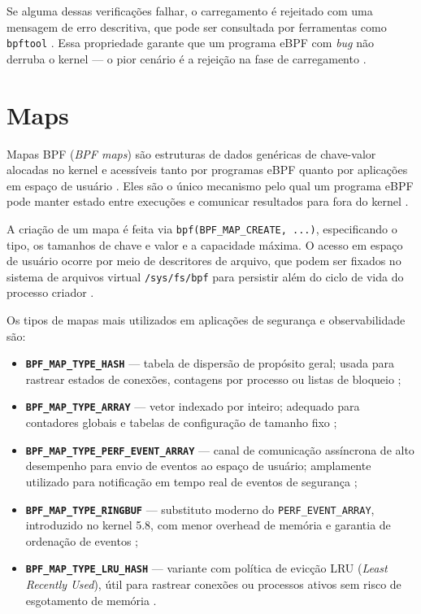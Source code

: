 Se alguma dessas verificações falhar, o carregamento é rejeitado com uma mensagem
de erro descritiva, que pode ser consultada por ferramentas como \texttt{bpftool}
\cite{bcc}.
Essa propriedade garante que um programa eBPF com \textit{bug} não derruba o
kernel — o pior cenário é a rejeição na fase de carregamento
\cite{gregg2019}.

\section{Maps}

Mapas BPF (\textit{BPF maps}) são estruturas de dados genéricas de chave-valor
alocadas no kernel e acessíveis tanto por programas eBPF quanto por aplicações
em espaço de usuário \cite{linuxkernel2024}.
Eles são o único mecanismo pelo qual um programa eBPF pode manter estado entre
execuções e comunicar resultados para fora do kernel \cite{gregg2019}.

A criação de um mapa é feita via \texttt{bpf(BPF\_MAP\_CREATE, ...)}, especificando
o tipo, os tamanhos de chave e valor e a capacidade máxima.
O acesso em espaço de usuário ocorre por meio de descritores de arquivo, que
podem ser fixados no sistema de arquivos virtual \texttt{/sys/fs/bpf} para
persistir além do ciclo de vida do processo criador \cite{linuxkernel2024}.

Os tipos de mapas mais utilizados em aplicações de segurança e observabilidade são:

\begin{itemize}
  \item \textbf{\texttt{BPF\_MAP\_TYPE\_HASH}} — tabela de dispersão de propósito
        geral; usada para rastrear estados de conexões, contagens por processo ou
        listas de bloqueio \cite{linuxkernel2024};

  \item \textbf{\texttt{BPF\_MAP\_TYPE\_ARRAY}} — vetor indexado por inteiro;
        adequado para contadores globais e tabelas de configuração de tamanho fixo
        \cite{gregg2019};

  \item \textbf{\texttt{BPF\_MAP\_TYPE\_PERF\_EVENT\_ARRAY}} — canal de
        comunicação assíncrona de alto desempenho para envio de eventos ao espaço
        de usuário; amplamente utilizado para notificação em tempo real de eventos
        de segurança \cite{linuxkernel2024};

  \item \textbf{\texttt{BPF\_MAP\_TYPE\_RINGBUF}} — substituto moderno do
        \texttt{PERF\_EVENT\_ARRAY}, introduzido no kernel 5.8, com menor
        overhead de memória e garantia de ordenação de eventos \cite{linuxkernel2024};

  \item \textbf{\texttt{BPF\_MAP\_TYPE\_LRU\_HASH}} — variante com política
        de evicção LRU (\textit{Least Recently Used}), útil para rastrear
        conexões ou processos ativos sem risco de esgotamento de memória
        \cite{gregg2020}.
\end{itemize}

